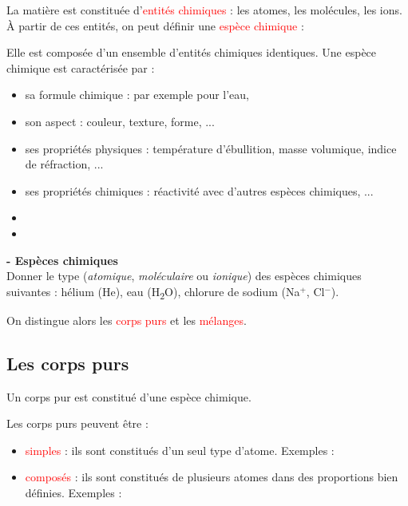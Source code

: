 La matière est constituée d'\textcolor{red}{entités chimiques} : les atomes, les molécules, les ions. \`{A} partir de ces entités, on peut définir une \textcolor{red}{espèce chimique} :
\begin{tcolorbox}[colback=green!5!white,colframe=green!75!black,title=\textbf{Espèce chimique}, upperbox=invisible]
Elle est composée d'un ensemble d'entités chimiques identiques. Une espèce chimique est caractérisée par :
\begin{itemize}
    \item sa formule chimique : par exemple  pour l'eau,
    \item son aspect : couleur, texture, forme, ...
    \item ses propriétés physiques : température d'ébullition, masse volumique, indice de réfraction, ...
    \item ses propriétés chimiques : réactivité avec d'autres espèces chimiques, ... 
    \item 
    \item
\end{itemize}

\end{tcolorbox}

\begin{mdframed}[style=autreexo]
\textbf{ - Espèces chimiques}\\
Donner le type (\textit{atomique}, \textit{moléculaire} ou \textit{ionique}) des espèces chimiques suivantes : hélium (He), eau (H\textsubscript{2}O), chlorure de sodium (Na$^{+}$, Cl$^{-}$).
\end{mdframed}

On distingue alors les \textcolor{red}{corps purs} et les \textcolor{red}{mélanges}.

\subsection{Les corps purs}
\begin{tcolorbox}[colback=green!5!white,colframe=green!75!black,title=\textbf{Corps purs}]
Un corps pur est constitué d'une espèce chimique.
\end{tcolorbox}

Les corps purs peuvent être :

\begin{itemize}
    \item \textcolor{red}{simples} : ils sont constitués d'un seul type d'atome. Exemples : %
    \item \textcolor{red}{composés} : ils sont constitués de plusieurs atomes dans des proportions bien définies. Exemples : %
\end{itemize}


